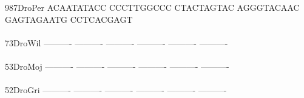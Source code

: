 \documentclass[11pt,twoside,reqno,a4paper]{article}
\begin{document}
{987\hspace*{2\charwidth}DroPer	ACAATATACC	CCCTTGGCCC	CTACTAGTAC	AGGGTACAAC	GAGTAGAATG	CCTCACGAGT	\\
\hspace*{5\charwidth}\hspace*{7\charwidth}\hspace*{1\charwidth}\hspace*{1\charwidth}\hspace*{1\charwidth}\hspace*{1\charwidth}\hspace*{1\charwidth}\hspace*{1\charwidth}\\
73\hspace*{3\charwidth}DroWil	----------	----------	----------	----------	----------	----------	\\
\hspace*{5\charwidth}\hspace*{7\charwidth}\hspace*{1\charwidth}\hspace*{1\charwidth}\hspace*{1\charwidth}\hspace*{1\charwidth}\hspace*{1\charwidth}\hspace*{1\charwidth}\\
53\hspace*{3\charwidth}DroMoj	----------	----------	----------	----------	----------	----------	\\
\hspace*{5\charwidth}\hspace*{7\charwidth}\hspace*{1\charwidth}\hspace*{1\charwidth}\hspace*{1\charwidth}\hspace*{1\charwidth}\hspace*{1\charwidth}\hspace*{1\charwidth}\\
52\hspace*{3\charwidth}DroGri	----------	----------	----------	----------	----------	----------	\\
\hspace*{5\charwidth}\hspace*{7\charwidth}\hspace*{1\charwidth}\hspace*{1\charwidth}\hspace*{1\charwidth}\hspace*{1\charwidth}\hspace*{1\charwidth}\hspace*{1\charwidth}\\
}
\end{document}
